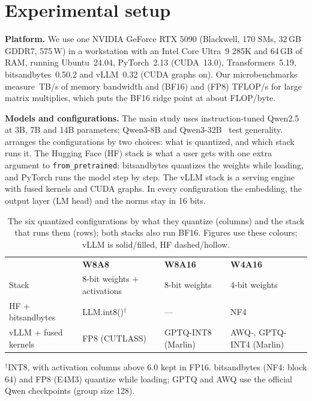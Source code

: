 \section{Experimental setup}
\label{sec:method}

\textbf{Platform.} We use one NVIDIA GeForce RTX 5090 (Blackwell, 170 SMs, 32\,GB GDDR7, 575\,W) in a
workstation with an Intel Core Ultra~9 285K and 64\,GB of RAM, running Ubuntu~24.04, PyTorch~2.13
(CUDA~13.0), Transformers~5.19, bitsandbytes~0.50.2 and vLLM~0.32 (CUDA graphs on). Our
microbenchmarks measure \BWmeas\,TB/s of memory bandwidth and \BFmeas{} (BF16) and \FPeightmeas{}
(FP8) TFLOP/s for large matrix multiplies, which puts the BF16 ridge point at about \RidgeBF{}
FLOP/byte.

\textbf{Models and configurations.} The main study uses instruction-tuned
Qwen2.5~\cite{qwen2024qwen25} at 3B, 7B and 14B parameters; Qwen3-8B and Qwen3-32B~\cite{qwen3} test
generality.  arranges the configurations by two choices: what is quantized, and
which stack runs it. The Hugging Face (HF) stack is what a user gets with one extra argument to
\texttt{from\_pretrained}: bitsandbytes quantizes the weights while loading, and PyTorch runs the
model step by step. The vLLM stack is a serving engine with fused kernels and CUDA graphs. In every
configuration the embedding, the output layer (LM head) and the norms stay in 16 bits.

\begin{table}[t]
\centering\small
\caption{The six quantized configurations by what they quantize (columns) and the stack that runs
them (rows); both stacks also run BF16. Figures use these colours; vLLM is solid/filled, HF dashed/hollow.}
\label{tab:configs}
\setlength{\tabcolsep}{4pt}
\begin{tabular}{llll}
\toprule
 & \textcolor[HTML]{008300}{\textbf{W8A8}} & \textcolor[HTML]{D55181}{\textbf{W8A16}} & \textcolor[HTML]{C98500}{\textbf{W4A16}} \\
Stack & 8-bit weights + activations & 8-bit weights & 4-bit weights \\
\midrule
HF + bitsandbytes & LLM.int8()$^{\dagger}$ & --- & NF4 \\
vLLM + fused kernels & FP8 (CUTLASS) & GPTQ-INT8 (Marlin) & AWQ-, GPTQ-INT4 (Marlin) \\
\bottomrule
\end{tabular}
\par\vspace{3pt}\parbox{\linewidth}{\scriptsize $^{\dagger}$INT8, with activation columns above 6.0
kept in FP16. bitsandbytes (NF4: block 64) and FP8 (E4M3) quantize while loading; GPTQ and AWQ use the
official Qwen checkpoints (group size 128).}
\end{table}

